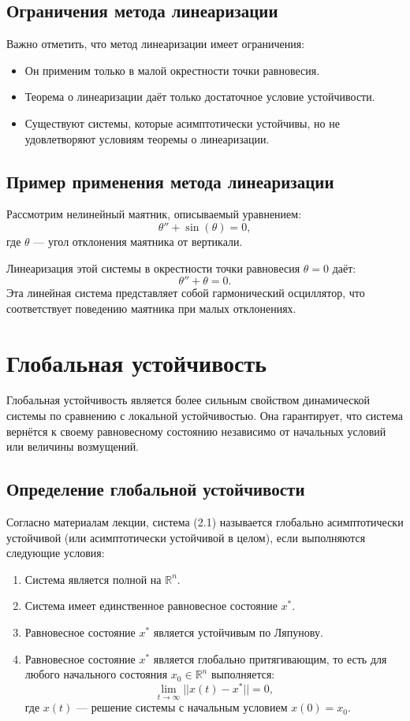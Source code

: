 \documentclass[a4paper,14pt]{extarticle} %
\begin{document}
\subsection{Ограничения метода линеаризации}

Важно отметить, что метод линеаризации имеет ограничения:
\begin{itemize}
    \item Он применим только в малой окрестности точки равновесия.
    \item Теорема о линеаризации даёт только достаточное условие устойчивости.
    \item Существуют системы, которые асимптотически устойчивы, но не удовлетворяют условиям теоремы о линеаризации.
\end{itemize}

\subsection{Пример применения метода линеаризации}

Рассмотрим нелинейный маятник, описываемый уравнением:
\[
\theta'' + \sin(\theta) = 0,
\]
где \(\theta\) — угол отклонения маятника от вертикали.

Линеаризация этой системы в окрестности точки равновесия \(\theta = 0\) даёт:
\[
\theta'' + \theta = 0.
\]
Эта линейная система представляет собой гармонический осциллятор, что соответствует поведению маятника при малых отклонениях.

\section{Глобальная устойчивость}

Глобальная устойчивость является более сильным свойством динамической системы по сравнению с локальной устойчивостью. Она гарантирует, что система вернётся к своему равновесному состоянию независимо от начальных условий или величины возмущений.

\subsection{Определение глобальной устойчивости}

Согласно материалам лекции, система (2.1) называется глобально асимптотически устойчивой (или асимптотически устойчивой в целом), если выполняются следующие условия:
\begin{enumerate}
    \item Система является полной на \(\mathbb{R}^n\).
    \item Система имеет единственное равновесное состояние \(x^*\).
    \item Равновесное состояние \(x^*\) является устойчивым по Ляпунову.
    \item Равновесное состояние \(x^*\) является глобально притягивающим, то есть для любого начального состояния \(x_0 \in \mathbb{R}^n\) выполняется:
    \[
    \lim_{t \to \infty} ||x(t) - x^*|| = 0,
    \]
    где \(x(t)\) — решение системы с начальным условием \(x(0) = x_0\).
\end{enumerate}
\end{document}
